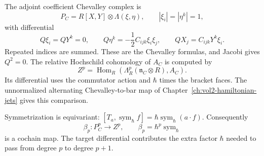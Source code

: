 The adjoint coefficient Chevalley complex is
\[
 P_C=R[X,Y]\otimes\Lambda(\xi,\eta),
 \qquad |\xi_i|=|\eta^k|=1,
\]
with differential
\[
 Q\xi_i=QY^k=0,\qquad
 Q\eta^k=-\frac12C_{ijk}\xi_i\xi_j,\qquad
 QX_j=C_{ijk}Y^k\xi_i.
\]
Repeated indices are summed.
These are the Chevalley formulas, and Jacobi gives
$Q^2=0$.
The relative Hochschild cohomology of $A_C$ is
computed by
\[
 Z^p=\operatorname{Hom}_R
       (\Lambda_R^p(\mathfrak n_C\otimes R),A_C).
\]
Its differential uses the commutator action and
$\hbar$ times the bracket faces.
The unnormalized alternating Chevalley-to-bar map
of Chapter~\ref{ch:vol2-hamiltonian-jets}
gives this comparison.

Symmetrization is equivariant:
$[T_a,\operatorname{sym}_\hbar f]
  =\hbar\operatorname{sym}_\hbar(a\cdot f)$.
Consequently
\begin{equation}\label{eq:vol2-colour-beta}
 \beta_p:P_C^p\longrightarrow Z^p,\qquad
 \beta_p=\hbar^p\operatorname{sym}_\hbar
\end{equation}
is a cochain map.
The target differential contributes the extra factor
$\hbar$ needed to pass from degree $p$ to degree $p+1$.

